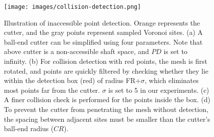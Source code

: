 \begin{figure}[t]

\centering
\texttt{[image: images/collision-detection.png]}
    \caption{Illustration of inaccessible point detection. Orange represents the cutter, and the gray points represent sampled Voronoi sites. (a) A ball-end cutter can be simplified using four parameters. Note that above cutter is a non-accessible shaft space, and $PD$ is set to infinity. (b) For collision detection with red points, the mesh is first rotated, and points are quickly filtered by checking whether they lie within the detection box (red) of radius FR+$\sigma$, which eliminates most points far from the cutter. $\sigma$ is set to 5 in our experiments. (c) A finer collision check is performed for the points inside the box. (d) To prevent the cutter from penetrating the mesh without detection, the spacing between adjacent sites must be smaller than the cutter’s ball-end radius ($CR$).}
\label{fig:collision-detection}    
\end{figure}